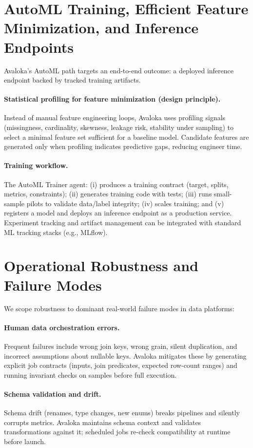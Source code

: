 \documentclass{article} %
\begin{document}
\section{AutoML Training, Efficient Feature Minimization, and Inference Endpoints}
\label{sec:training}
Avaloka's AutoML path targets an end-to-end outcome: a deployed inference endpoint backed by tracked
training artifacts.

\paragraph{Statistical profiling for feature minimization (design principle).}
Instead of manual feature engineering loops, Avaloka uses profiling signals (missingness, cardinality,
skewness, leakage risk, stability under sampling) to select a minimal feature set sufficient for a baseline
model. Candidate features are generated only when profiling indicates predictive gaps, reducing engineer time.

\paragraph{Training workflow.}
The AutoML Trainer agent:
(i) produces a training contract (target, splits, metrics, constraints);
(ii) generates training code with tests; (iii) runs small-sample pilots to validate data/label integrity;
(iv) scales training; and (v) registers a model and deploys an inference endpoint as a production service.
Experiment tracking and artifact management can be integrated with standard ML tracking stacks (e.g., MLflow).

\section{Operational Robustness and Failure Modes}
\label{sec:robustness}
We scope robustness to dominant real-world failure modes in data platforms:

\paragraph{Human data orchestration errors.}
Frequent failures include wrong join keys, wrong grain, silent duplication, and incorrect assumptions about
nullable keys. Avaloka mitigates these by generating explicit job contracts (inputs, join predicates, expected
row-count ranges) and running invariant checks on samples before full execution.

\paragraph{Schema validation and drift.}
Schema drift (renames, type changes, new enums) breaks pipelines and silently corrupts metrics. Avaloka
maintains schema context and validates transformations against it; scheduled jobs re-check compatibility at
runtime before launch.
\end{document}
